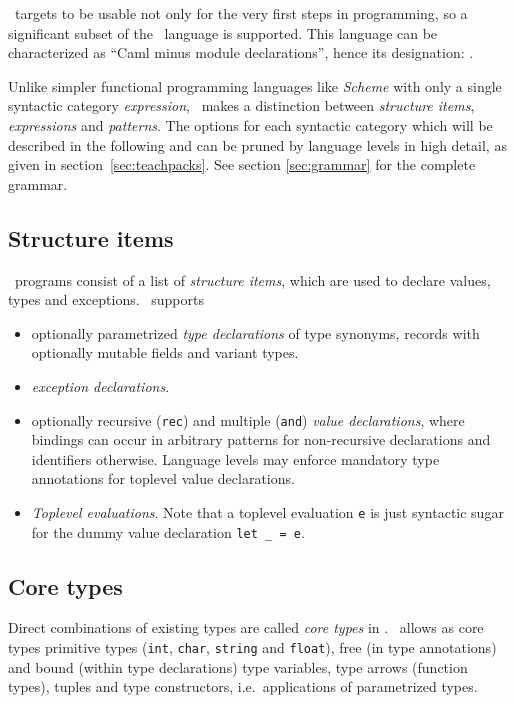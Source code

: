 \easyocaml\ targets to be usable not only for the very first steps in
programming, so a significant subset of the \ocaml\ language is supported.
This language can be characterized as ``Caml minus module declarations'',
hence its designation: \camlm.

Unlike simpler functional programming languages like \textit{Scheme} with only
a single syntactic category \emph{expression}, \ocaml\ makes a distinction
between \emph{structure items}, \emph{expressions} and \emph{patterns}.
The options for each syntactic category which will be described in the
following and can be pruned by language levels in high detail, as given in
section~\ref{sec:teachpacks}.
See section \ref{sec:grammar} for the complete grammar.


\subsection*{Structure items}

\ocaml\ programs consist of a list of \emph{structure items}, which are used to
declare values, types and exceptions.
\easyocaml\ supports
\begin{itemize}
  \item optionally parametrized \emph{type declarations} of type synonyms,
    records with optionally mutable fields and variant types.
  \item \emph{exception declarations}.
  \item optionally recursive (\texttt{rec}) and multiple (\texttt{and})
    \emph{value declarations}, where bindings can occur in arbitrary patterns
    for non-recursive declarations and identifiers otherwise.
    Language levels may enforce mandatory type annotations for toplevel value
    declarations.
  \item \emph{Toplevel evaluations}. Note that a toplevel evaluation 
    \texttt{e} is just syntactic sugar for the dummy value declaration
    \texttt{let \_ = e}.
\end{itemize}

\subsection*{Core types}
Direct combinations of existing types are called \emph{core types} in \ocaml.
\easyocaml\ allows as core types primitive types (\texttt{int}, \texttt{char},
\texttt{string} and \texttt{float}), free (in type annotations) and bound
(within type declarations) type variables, type arrows (function types), tuples
and type constructors, i.e.\ applications of parametrized types.

